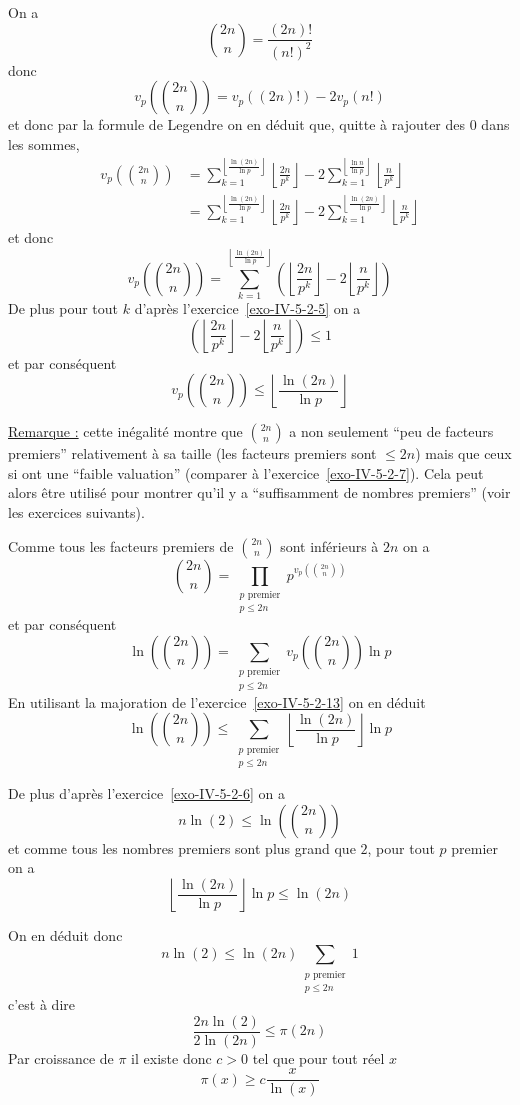 \begin{sol}
On a
$$\binom{2n} n = \frac{(2n)!}{(n!)^2}$$
donc
$$v_p\left(\binom{2n} n\right) = v_p \left( (2n)!\right)-2 v_p(n!)$$
et donc par la formule de Legendre on en déduit que, quitte à rajouter des $0$ dans les sommes,
$$\begin{aligned}
    v_p\left( \binom{2n} n\right) &= \sum_{k=1}^{\left\lfloor \frac{\ln(2n)}{\ln p} \right\rfloor} \left\lfloor \frac{2n}{p^k} \right\rfloor - 2 \sum_{k=1}^{\left\lfloor \frac{\ln n}{\ln p} \right\rfloor}\left\lfloor \frac n{p^k} \right\rfloor  \\
    &= \sum_{k=1}^{\left\lfloor \frac{\ln(2n)}{\ln p} \right\rfloor} \left\lfloor \frac{2n}{p^k} \right\rfloor - 2 \sum_{k=1}^{\left\lfloor \frac{\ln(2n)}{\ln p} \right\rfloor}\left\lfloor \frac n{p^k} \right\rfloor  
\end{aligned}$$
et donc
$$\boxed{v_p\left( \binom{2n} n\right) = \sum_{k=1}^{\left\lfloor \frac{\ln(2n)}{\ln p} \right\rfloor} \left(\left\lfloor \frac{2n}{p^k} \right\rfloor - 2 \left\lfloor \frac n{p^k} \right\rfloor  \right)}$$
De plus pour tout $k$ d'après l'exercice~\ref{exo-IV-5-2-5} on a
$$\left(\left\lfloor \frac{2n}{p^k} \right\rfloor - 2 \left\lfloor \frac n{p^k} \right\rfloor  \right) \le 1$$
et par conséquent
$$\boxed{v_p\left( \binom{2n} n\right) \le \left\lfloor \frac{\ln(2n)}{\ln p} \right\rfloor}$$

\underline{Remarque :} cette inégalité montre que $\binom{2n} n$ a non seulement ``peu de facteurs premiers'' relativement à sa taille (les facteurs premiers sont $\le 2n$) mais que ceux si ont une ``faible valuation'' (comparer à l'exercice~\ref{exo-IV-5-2-7}). Cela peut alors être utilisé pour montrer qu'il y a ``suffisamment de nombres premiers'' (voir les exercices suivants).
\end{sol}
    

\begin{sol}
Comme tous les facteurs premiers de $\binom{2n} n$ sont inférieurs à $2n$ on a
$$\binom{2n} n = \prod_{\substack{p \text{ premier} \\ p \le 2n }} p^{v_p \left( \binom{2n} n\right)}$$
et par conséquent
$$\ln \left( \binom{2n} n\right) = \sum_{\substack{p \text{ premier} \\ p \le 2n }}  v_p \left( \binom{2n} n\right)\ln p$$ 
En utilisant la majoration de l'exercice~\ref{exo-IV-5-2-13} on en déduit
$$\boxed{\ln \left( \binom{2n} n\right) \le \sum_{\substack{p \text{ premier} \\ p \le 2n }} \left\lfloor \frac{\ln(2n)}{\ln p} \right\rfloor \ln p}$$ 

De plus d'après l'exercice~\ref{exo-IV-5-2-6} on a 
$$n \ln(2) \le \ln \left( \binom{2n} n\right)$$
et comme tous les nombres premiers sont plus grand que $2$, pour tout $p$ premier on a
$$\left\lfloor \frac{\ln(2n)}{\ln p} \right\rfloor \ln p \le  \ln(2n)$$

On en déduit donc
$$n \ln(2) \le \ln(2n) \sum_{\substack{p \text{ premier} \\ p \le 2n }} 1$$
c'est à dire
$$\frac{2 n \ln(2)}{2\ln(2n)} \le \pi(2n)$$
Par croissance de $\pi$ il existe donc $c > 0$ tel que pour tout réel $x$
$$\pi(x) \ge c \frac x{\ln(x)}$$
\end{sol}

